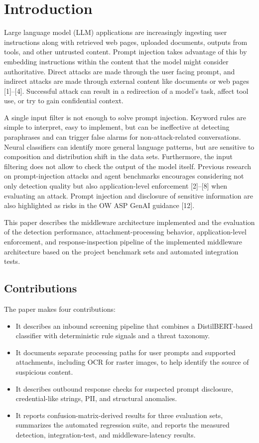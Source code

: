 \documentclass[conference]{IEEEtran}
\begin{document}
\section{Introduction}
Large language model (LLM) applications are increasingly ingesting user instructions along with retrieved web pages, uploaded documents, outputs from tools, and other untrusted content. Prompt injection takes advantage of this by embedding instructions within the content that the model might consider authoritative. Direct attacks are made through the user facing prompt, and indirect attacks are made through external content like documents or web pages [1]--[4]. Successful attack can result in a redirection of a model's task, affect tool use, or try to gain confidential context.

A single input filter is not enough to solve prompt injection. Keyword rules are simple to interpret, easy to implement, but can be ineffective at detecting paraphrases and can trigger false alarms for non-attack-related conversations. Neural classifiers can identify more general language patterns, but are sensitive to composition and distribution shift in the data sets. Furthermore, the input filtering does not allow to check the output of the model itself. Previous research on prompt-injection attacks and agent benchmarks encourages considering not only detection quality but also application-level enforcement [2]--[8] when evaluating an attack. Prompt injection and disclosure of sensitive information are also highlighted as risks in the OW ASP GenAI guidance [12].

This paper describes the middleware architecture implemented and the evaluation of the detection performance, attachment-processing behavior, application-level enforcement, and response-inspection pipeline of the implemented middleware architecture based on the project benchmark sets and automated integration tests.

\subsection{Contributions}
The paper makes four contributions:
\begin{itemize}
    \item It describes an inbound screening pipeline that combines a DistilBERT-based classifier with deterministic rule signals and a threat taxonomy.
    \item It documents separate processing paths for user prompts and supported attachments, including OCR for raster images, to help identify the source of suspicious content.
    \item It describes outbound response checks for suspected prompt disclosure, credential-like strings, PII, and structural anomalies.
    \item It reports confusion-matrix-derived results for three evaluation sets, summarizes the automated regression suite, and reports the measured detection, integration-test, and middleware-latency results.
\end{itemize}
\end{document}
